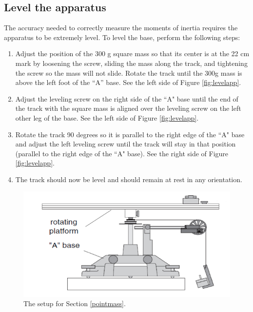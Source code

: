 \subsection{Level the apparatus}
The accuracy needed to correctly measure the moments of inertia requires the apparatus to be extremely level.  To level the base, perform the following steps:

\begin{enumerate}
	\item Adjust the position of the 300 g square mass so that its center is at the 22 cm mark by loosening the screw, sliding the mass along the track, and tightening the screw so the mass will not slide.  Rotate the track until the 300g mass is above the left foot of the ``A'' base. See the left side of Figure \ref{fig:levelapp}.
	\item Adjust the leveling screw on the right side of the ``A" base until the end of the track with the square mass is aligned over the leveling screw on the left other leg of the base. See the left side of Figure \ref{fig:levelapp}.
	\item Rotate the track 90 degrees so it is parallel to the right edge of the ``A" base and adjust the left leveling screw until the track will stay in that position (parallel to the right edge of the ``A" base). See the right side of Figure \ref{fig:levelapp}.
	\item The track should now be level and should remain at rest in any orientation.
\end{enumerate}

\begin{figure}[b]
	\begin{center}
		\includegraphics[width=0.6\linewidth]{./Exp1-7/pic/rotplat.png}
	\end{center}
	\caption{The setup for Section \ref{pointmass}.}
	\label{fig:rotpoint}
\end{figure}


